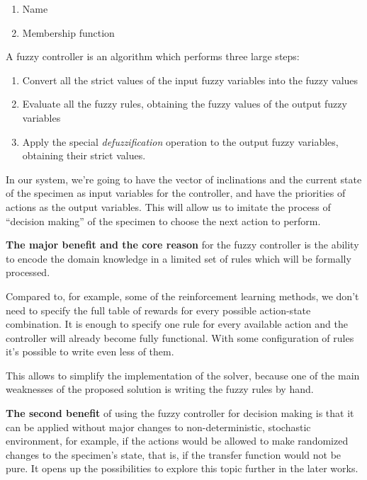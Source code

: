 \documentclass[11pt, a4paper]{article}
\begin{document}
  \begin{enumerate}
    \item Name
    \item Membership function
  \end{enumerate}

  A fuzzy controller is an algorithm which performs three large steps:

  \begin{enumerate}
    \item Convert all the strict values of the input fuzzy variables into the fuzzy values
    \item Evaluate all the fuzzy rules, obtaining the fuzzy values of the output fuzzy variables
    \item Apply the special \textit{defuzzification} operation to the output fuzzy variables, obtaining their strict values.
  \end{enumerate}

  In our system, we're going to have the vector of inclinations and the current state of the specimen as input variables for the controller,
  and have the priorities of actions as the output variables.
  This will allow us to imitate the process of ``decision making'' of the specimen to choose the next action to perform.

	\textbf{The major benefit and the core reason} for the fuzzy controller is the ability to encode the domain knowledge in a limited set of rules which will be formally processed.
	
	Compared to, for example, some of the reinforcement learning methods, we don't need to specify the full table of rewards for every possible action-state combination.
	It is enough to specify one rule for every available action and the controller will already become fully functional.
	With some configuration of rules it's possible to write even less of them.
	
	This allows to simplify the implementation of the solver, because one of the main weaknesses of the proposed solution is writing the fuzzy rules by hand.

  \textbf{The second benefit} of using the fuzzy controller for decision making is that it can be applied without major changes to non-deterministic, stochastic environment,
  for example, if the actions would be allowed to make randomized changes to the specimen's state, that is, if the transfer function would not be pure.
  It opens up the possibilities to explore this topic further in the later works.
	
\end{document}
